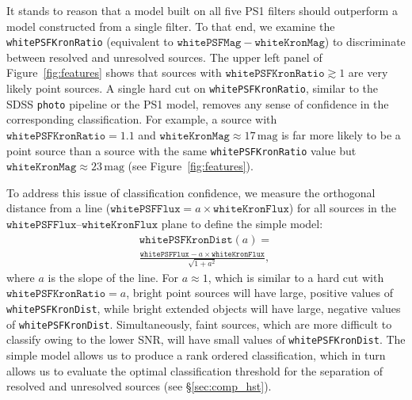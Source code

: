 \documentclass[twocolumn, dvipdfmx]{aastex62}
\begin{document}
\begin{CJK*}{UTF8}{gbsn}
It stands to reason that a model built on all five PS1 filters should
outperform a model constructed from a single filter. To that end, we examine
the \texttt{whitePSFKronRatio} (equivalent to $\mathtt{whitePSFMag} -
\mathtt{whiteKronMag}$) to discriminate between resolved and unresolved
sources. The upper left panel of Figure~\ref{fig:features} shows that
sources with $\mathtt{whitePSFKronRatio} \gtrsim 1$ are very likely point sources. A single hard cut on \texttt{whitePSFKronRatio}, similar to the SDSS
\texttt{photo} pipeline or the PS1 model, removes any sense of confidence in
the corresponding classification. For example, a source with
$\mathtt{whitePSFKronRatio} = 1.1$ and $\mathtt{whiteKronMag} \approx
17\,\mathrm{mag}$ is far more likely to be a point source than a source with the
same \texttt{whitePSFKronRatio} value but $\mathtt{whiteKronMag} \approx
23\,\mathrm{mag}$ (see Figure~\ref{fig:features}).

To address this issue of classification confidence, we measure the
orthogonal distance from a line ($\mathtt{whitePSFFlux} = a\times
\mathtt{whiteKronFlux}$) for all sources in the
$\mathtt{whitePSFFlux}$--$\mathtt{whiteKronFlux}$ plane to define the simple model:
%
\begin{multline}
 \mathtt{whitePSFKronDist}(a) = \\
 \frac{\mathtt{whitePSFFlux} - a\times\mathtt{whiteKronFlux}}{ \sqrt{1 + a^2}},
 \label{eqn:psfkrondist}
\end{multline}
%
where $a$ is the slope of the line. For $a \approx 1$, which is similar to a
hard cut with $\mathtt{whitePSFKronRatio} = a$, bright point sources will
have large, positive values of \texttt{whitePSFKronDist}, while bright
extended objects will have large, negative values of
\texttt{whitePSFKronDist}. Simultaneously, faint sources, which are more
difficult to classify owing to the lower SNR, will have small values of
\texttt{whitePSFKronDist}. The simple model allows us to produce a rank
ordered classification, which in turn allows us to evaluate the optimal
classification threshold for the separation of resolved and unresolved 
sources (see \S\ref{sec:comp_hst}).


\end{CJK*}
\end{document}
